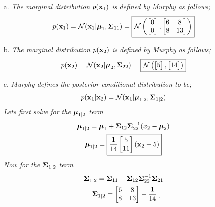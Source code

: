 \documentclass[12pt,letterpaper,fleqn]{hmcpset}
\begin{document}
\begin{solution}
\begin{enumerate}
\item[a.] \textit{The marginal distribution $p({\bf x}_1)$ is defined by Murphy as follows;}
\begin{align*}
p({\bf x}_1) = \mathcal{N}({\bf x}_1| \boldsymbol{\mu} _1, \hbox{\boldmath$\Sigma$}_{11})=\boxed{ \mathcal{N}\left(\begin{bmatrix}
0\\0
\end{bmatrix}, \begin{bmatrix}
6&8\\
8&13\\
\end{bmatrix}\right)}
\end{align*}
\item[b.]\textit{The marginal distribution $p({\bf x}_2)$ is defined by Murphy as follows;}
\begin{align*}
p({\bf x}_2) = \mathcal{N}({\bf x}_2| \boldsymbol{\mu} _2, \hbox{\boldmath$\Sigma$}_{22})=\boxed{ \mathcal{N}\left(\begin{bmatrix}
5
\end{bmatrix}, \begin{bmatrix}
14
\end{bmatrix}\right)}
\end{align*}
\item[c.] \textit{Murphy defines the posterior conditional distribution to be; }
\begin{gather*}
p({\bf x}_1|{\bf x}_2) = \mathcal{N}({\bf x}_1 | \hbox{\boldmath$\mu$}_{1|2}, \hbox{\boldmath$\Sigma$}_{1|2})
\end{gather*}
\textit{Lets first solve for the $\boldsymbol{\mu}_{1|2}$ term}
\begin{gather*}
\hbox{\boldmath$\mu$}_{1|2} = \hbox{\boldmath$\mu$}_1+\hbox{\boldmath$\Sigma$}_{12} \hbox{\boldmath$\Sigma$}_{22}^{-1}(x_2-\hbox{\boldmath$\mu$}_{2}) \\
\hbox{\boldmath$\mu$}_{1|2} = \boxed{\frac{1}{14}\begin{bmatrix}
5 \\11
\end{bmatrix} ({\bf x}_2-5)}\\
\end{gather*}
\textit{Now for the $\hbox{\boldmath$\Sigma$}_{1|2}$ term} 
\begin{gather*}
\hbox{\boldmath$\Sigma$}_{1|2} = \hbox{\boldmath$\Sigma$}_{11} - \hbox{\boldmath$\Sigma$}_{12} \hbox{\boldmath$\Sigma$}_{22}^{-1} \hbox{\boldmath$\Sigma$}_{21}\\
\hbox{\boldmath$\Sigma$}_{1|2} = \begin{bmatrix}
6&8\\
8&13
\end{bmatrix} - \frac{1}{14} \begin{bmatrix}

\end{bmatrix}
\end{gather*}
\end{enumerate}
\end{solution}
\end{document}
